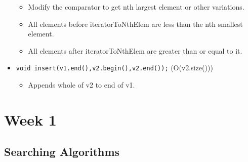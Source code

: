 \documentclass{report}
\newcommand{\citem}[1]{\item \texttt{#1}}
\begin{document}
\begin{itemize}
\begin{itemize}
        \item Modify the comparator to get nth largest element or other variations.
        \item All elements before iteratorToNthElem are less than the nth smallest element.
        \item All elements after iteratorToNthElem are greater than or equal to it.
    \end{itemize}
    \citem{void insert(v1.end(),v2.begin(),v2.end());} (O(v2.size()))
    \begin{itemize}
        \item Appends whole of v2 to end of v1.
    \end{itemize}
\end{itemize}

\chapter{Week 1}
\section{Searching Algorithms}
\end{document}
